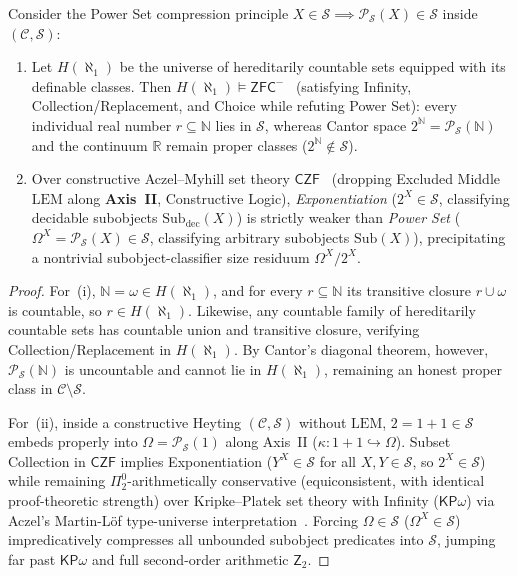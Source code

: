 \begin{proposition}\label{prop:pointillist-continuum}%
%
Consider the Power Set compression principle $X \in \mathcal{S} \implies \mathcal{P}_{\mathcal{S}}(X) \in \mathcal{S}$ inside $(\mathcal{C}, \mathcal{S})$:
\begin{enumerate}
  \item Let $H(\aleph_1)$ be the universe of hereditarily countable sets equipped with its definable classes. Then $H(\aleph_1) \models \mathsf{ZFC}^-$~\cite{GitmanHamkinsJohnstone16} (satisfying Infinity, Collection/Replacement, and Choice while refuting Power Set): every individual real number $r \subseteq \mathbb{N}$ lies in $\mathcal{S}$, whereas Cantor space $2^{\mathbb{N}} = \mathcal{P}_{\mathcal{S}}(\mathbb{N})$ and the continuum $\mathbb{R}$ remain proper classes ($2^{\mathbb{N}} \notin \mathcal{S}$).
  \item Over constructive Aczel--Myhill set theory $\mathsf{CZF}$~\cite{Aczel78} (dropping Excluded Middle $\mathrm{LEM}$ along \textbf{Axis~II}, Constructive Logic), \emph{Exponentiation} ($2^X \in \mathcal{S}$, classifying decidable subobjects $\mathrm{Sub}_{\mathrm{dec}}(X)$) is strictly weaker than \emph{Power Set} ($\Omega^X = \mathcal{P}_{\mathcal{S}}(X) \in \mathcal{S}$, classifying arbitrary subobjects $\mathrm{Sub}(X)$), precipitating a nontrivial subobject-classifier size residuum $\Omega^X / 2^X$.
\end{enumerate}
\end{proposition}

\begin{proof}
For~(i), $\mathbb{N} = \omega \in H(\aleph_1)$, and for every $r \subseteq \mathbb{N}$ its transitive closure $r \cup \omega$ is countable, so $r \in H(\aleph_1)$. Likewise, any countable family of hereditarily countable sets has countable union and transitive closure, verifying Collection/Replacement in $H(\aleph_1)$. By Cantor's diagonal theorem, however, $\mathcal{P}_{\mathcal{S}}(\mathbb{N})$ is uncountable and cannot lie in $H(\aleph_1)$, remaining an honest proper class in $\mathcal{C} \setminus \mathcal{S}$.

For~(ii), inside a constructive Heyting $(\mathcal{C}, \mathcal{S})$ without $\mathrm{LEM}$, $2 = 1 + 1 \in \mathcal{S}$ embeds properly into $\Omega = \mathcal{P}_{\mathcal{S}}(1)$ along Axis~II ($\kappa : 1 + 1 \hookrightarrow \Omega$). Subset Collection in $\mathsf{CZF}$ implies Exponentiation ($Y^X \in \mathcal{S}$ for all $X, Y \in \mathcal{S}$, so $2^X \in \mathcal{S}$) while remaining $\Pi^0_2$-arithmetically conservative (equiconsistent, with identical proof-theoretic strength) over Kripke--Platek set theory with Infinity ($\mathsf{KP}\omega$) via Aczel's Martin-L\"of type-universe interpretation~\cite{Aczel78}. Forcing $\Omega \in \mathcal{S}$ ($\Omega^X \in \mathcal{S}$) impredicatively compresses all unbounded subobject predicates into $\mathcal{S}$, jumping far past $\mathsf{KP}\omega$ and full second-order arithmetic $\mathsf{Z}_2$.
\end{proof}

